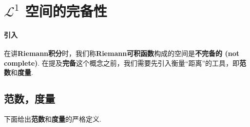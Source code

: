 \section{$\mathcal{L}^1$ 空间的完备性}
\paragraph{引入}
	在讲\textbf{Riemann积分}时，我们称\textbf{Riemann可积函数}构成的空间是\textbf{不完备的 (not complete)}. 在提及\textbf{完备}这个概念之前，我们需要先引入衡量“距离”的工具，即\textbf{范数}和\textbf{度量}.
	
	\vspace{2em}
	\subsection{范数，度量}
 	下面给出\textbf{范数}和\textbf{度量}的严格定义.
